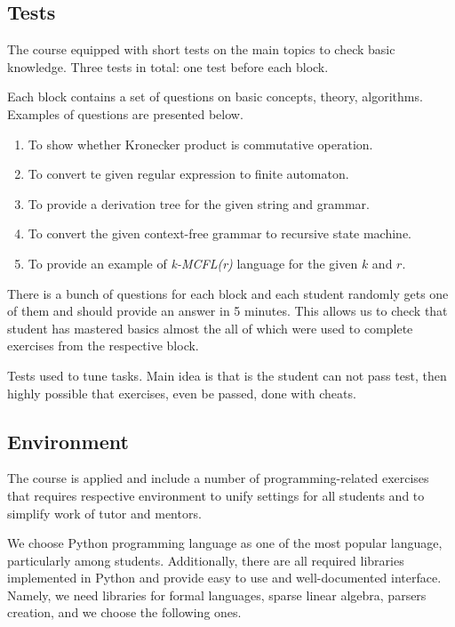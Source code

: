 \documentclass[sigconf]{acmart}
\begin{document}
\subsection{Tests}

The course equipped with short tests on the main topics to check basic knowledge.
Three tests in total: one test before each block. 

Each block contains a set of questions on basic concepts, theory, algorithms.
Examples of questions are presented below.
\begin{enumerate}
   \item To show whether Kronecker product is commutative operation. 
   \item To convert te given regular expression to finite automaton.
   \item To provide a derivation tree for the given string and grammar.
   \item To convert the given context-free grammar to recursive state machine.
   \item To provide an example of \emph{k-MCFL(r)} language for the given $k$ and $r$.
\end{enumerate} 

There is a bunch of questions for each block and each student randomly gets one of them and should provide an answer in 5 minutes. 
This allows us to check that student has mastered basics almost the all of which were used to complete exercises from the respective block.

Tests used to tune tasks. Main idea is that is the student can not pass test, then highly possible that exercises, even be passed, done with cheats.


\subsection{Environment}

The course is applied and include a number of programming-related exercises that requires respective environment to unify settings for all students and to simplify work of tutor and mentors.

We choose Python programming language as one of the most popular language, particularly among students.
Additionally, there are all required libraries implemented in Python and provide easy to use and well-documented interface.
Namely, we need libraries for formal languages, sparse linear algebra, parsers creation, and we choose the following ones.
\end{document}
